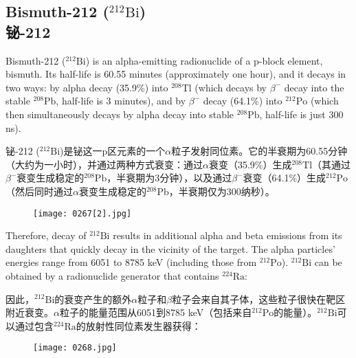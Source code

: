 \documentclass[dvipsnames, svgnames,a4paper,11pt]{article}
\begin{document}
\subsection{Bismuth-212 (\(\mathrm{^{212}Bi}\))\\铋-212}  
Bismuth-212 (\(\mathrm{^{212}Bi}\)) is an alpha-emitting radionuclide of a p-block element, bismuth. Its half-life is 60.55 minutes (approximately one hour), and it decays in two ways: by alpha decay (35.9\%) into \(\mathrm{^{208}Tl}\) (which decays by \(\beta^{-}\) decay into the stable \(\mathrm{^{208}Pb}\), half-life is 3 minutes), and by \(\beta^{-}\) decay (64.1\%) into \(\mathrm{^{212}Po}\) (which then simultaneously decays by alpha decay into stable \(\mathrm{^{208}Pb}\), half-life is just 300 ns).  

 
铋-212 (\(\mathrm{^{212}Bi}\))是铋这一p区元素的一个$\alpha$粒子发射同位素。它的半衰期为60.55分钟（大约为一小时），并通过两种方式衰变：通过$\alpha$衰变（35.9\%）生成\(\mathrm{^{208}Tl}\)（其通过\(\beta^{-}\)衰变生成稳定的\(\mathrm{^{208}Pb}\)，半衰期为3分钟），以及通过\(\beta^{-}\)衰变（64.1\%）生成\(\mathrm{^{212}Po}\)（然后同时通过$\alpha$衰变生成稳定的\(\mathrm{^{208}Pb}\)，半衰期仅为300纳秒）。  

\begin{figure}[h]
	\centering
    \texttt{[image: 0267[2].jpg]}  
     \label{fig357}
\end{figure}

Therefore, decay of \(\mathrm{^{212}Bi}\) results in additional alpha and beta emissions from its daughters that quickly decay in the vicinity of the target. The alpha particles' energies range from 6051 to 8785 keV (including those from \(\mathrm{^{212}Po}\)). \(\mathrm{^{212}Bi}\) can be obtained by a radionuclide generator that contains \(\mathrm{^{224}Ra}\):  

因此，\(\mathrm{^{212}Bi}\)的衰变产生的额外$\alpha$粒子和$\beta$粒子会来自其子体，这些粒子很快在靶区附近衰变。$\alpha$粒子的能量范围从6051到8785 keV（包括来自\(\mathrm{^{212}Po}\)的能量）。\(\mathrm{^{212}Bi}\)可以通过包含\(\mathrm{^{224}Ra}\)的放射性同位素发生器获得：  

\begin{figure}[h]
	\centering
    \texttt{[image: 0268.jpg]}  
     \label{fig358}
\end{figure}
\end{document}
